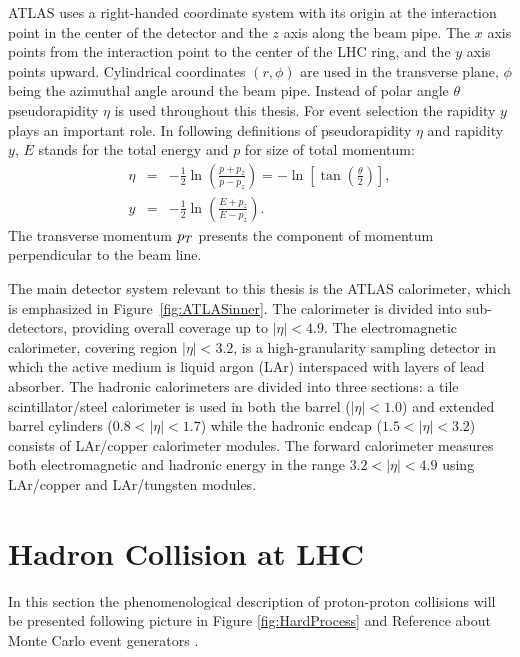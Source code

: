 ATLAS uses a right-handed coordinate system with its origin at the interaction
point in the center of the detector and the $z$ axis along the beam pipe. The
$x$ axis points from the interaction point to the center of the LHC ring, and
the $y$ axis points upward. Cylindrical coordinates $(r, \phi)$ are used in the
transverse plane, $\phi$ being the azimuthal angle around the beam pipe. Instead
of polar angle $\theta$ pseudorapidity $\eta$ is used throughout this thesis. For
event selection the rapidity $y$ plays an important role. In following
definitions of pseudorapidity $\eta$ and rapidity $y$, $E$ stands for the total
energy and $p$ for size of total momentum: 
\begin{eqnarray}
  \eta &= & - \frac{1}{2} \ln \left( \frac{p+p_z}{p-p_z} \right) = - \ln \left[
  \tan \left( \frac{\theta}{2} \right) \right], \\ y &= &- \frac{1}{2} \ln
  \left( \frac{E+p_z}{E-p_z} \right).	
\end{eqnarray}
The transverse momentum $p_{T}$ presents the component of momentum perpendicular
to the beam line.  

The main detector system relevant to this thesis is the ATLAS calorimeter,
which is emphasized in Figure~\ref{fig:ATLASinner}. The calorimeter is divided
into sub-detectors, providing overall coverage up to $|\eta| < 4.9$. The
electromagnetic calorimeter, covering region $|\eta| < 3.2$, is a
high-granularity sampling detector in which the active medium is liquid argon
(LAr) interspaced with layers of lead absorber. The hadronic calorimeters are
divided into three sections: a tile scintillator/steel calorimeter is used in
both the barrel ($|\eta| < 1.0$) and extended barrel cylinders ($0.8 < |\eta| <
1.7$) while the hadronic endcap ($1.5 < |\eta| < 3.2$) consists of LAr/copper
calorimeter modules. The forward calorimeter measures both electromagnetic and
hadronic energy in the range $3.2 < |\eta| < 4.9$ using LAr/copper and
LAr/tungsten modules. 

\section{Hadron Collision at LHC}

In this section the phenomenological description of proton-proton collisions
will be presented following picture in Figure \ref{fig:HardProcess} and
Reference about Monte Carlo event generators \cite{PDG}.

